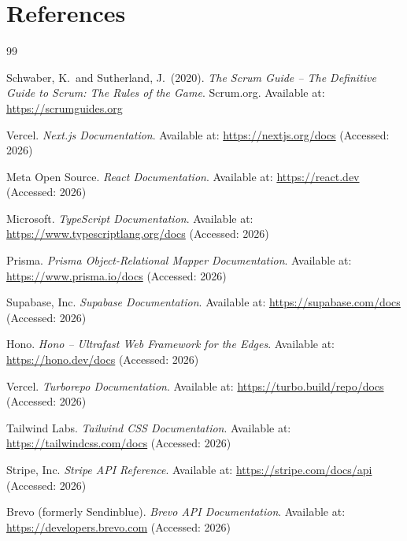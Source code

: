 ﻿\documentclass[12pt,a4paper]{report}
\begin{document}
\chapter*{References}
{}

\begin{thebibliography}{99}

    Schwaber, K.\ and Sutherland, J.\ (2020).
    \textit{The Scrum Guide -- The Definitive Guide to Scrum: The Rules of the Game}.
    Scrum.org.
    Available at: \url{https://scrumguides.org}

    Vercel.
    \textit{Next.js Documentation}.
    Available at: \url{https://nextjs.org/docs}
    (Accessed: 2026)

    Meta Open Source.
    \textit{React Documentation}.
    Available at: \url{https://react.dev}
    (Accessed: 2026)

    Microsoft.
    \textit{TypeScript Documentation}.
    Available at: \url{https://www.typescriptlang.org/docs}
    (Accessed: 2026)

    Prisma.
    \textit{Prisma Object-Relational Mapper Documentation}.
    Available at: \url{https://www.prisma.io/docs}
    (Accessed: 2026)

    Supabase, Inc.
    \textit{Supabase Documentation}.
    Available at: \url{https://supabase.com/docs}
    (Accessed: 2026)

    Hono.
    \textit{Hono -- Ultrafast Web Framework for the Edges}.
    Available at: \url{https://hono.dev/docs}
    (Accessed: 2026)

    Vercel.
    \textit{Turborepo Documentation}.
    Available at: \url{https://turbo.build/repo/docs}
    (Accessed: 2026)

    Tailwind Labs.
    \textit{Tailwind CSS Documentation}.
    Available at: \url{https://tailwindcss.com/docs}
    (Accessed: 2026)

    Stripe, Inc.
    \textit{Stripe API Reference}.
    Available at: \url{https://stripe.com/docs/api}
    (Accessed: 2026)

    Brevo (formerly Sendinblue).
    \textit{Brevo API Documentation}.
    Available at: \url{https://developers.brevo.com}
    (Accessed: 2026)


\end{thebibliography}
\end{document}
